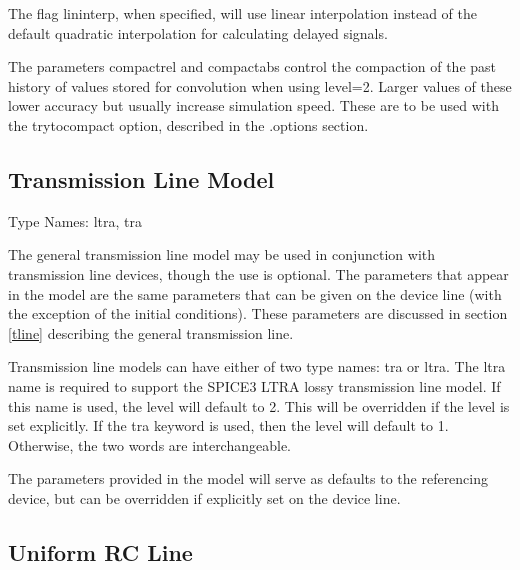 The flag {\vt lininterp}, when specified, will use linear
interpolation instead of the default quadratic interpolation for
calculating delayed signals.

The parameters {\vt compactrel} and {\vt compactabs} control the
compaction of the past history of values stored for convolution when
using {\vt level=2}.  Larger values of these lower accuracy but
usually increase simulation speed.  These are to be used with the {\vt
trytocompact} option, described in the {\vt .options} section.

\subsection{Transmission Line Model}
\label{ltramodel}


{\cb Type Names:} {\vt ltra}, {\vt tra}

The general transmission line model may be used in conjunction with
transmission line devices, though the use is optional.  The parameters
that appear in the model are the same parameters that can be given on
the device line (with the exception of the initial conditions).  These
parameters are discussed in section \ref{tline} describing the
general transmission line. 

Transmission line models can have either of two type names:  {\vt tra}
or {\vt ltra}.  The {\vt ltra} name is required to support the SPICE3
LTRA lossy transmission line model.  If this name is used, the {\vt
level} will default to 2.  This will be overridden if the level is set
explicitly.  If the {\vt tra} keyword is used, then the level will
default to 1.  Otherwise, the two words are interchangeable.

The parameters provided in the model will serve as defaults to the
referencing device, but can be overridden if explicitly set on the
device line.


\subsection{Uniform RC Line}



